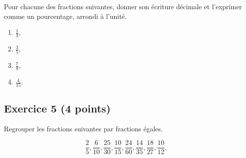 \documentclass[14 pt]{extarticle}
\theoremstyle{plain}
\begin{document}
Pour chacune des fractions suivantes, donner son écriture décimale et l'exprimer comme un pourcentage, arrondi à l'unité. 
\begin{enumerate}
\item $\frac13$,
\item $\frac35$,
\item $\frac79$,
\item $\frac{4}{15}$. 
\end{enumerate}

\subsection*{Exercice 5 (4 points)}
Regrouper les fractions suivantes par fractions égales. 

\[\frac25, \frac6{10}, \frac{25}{30},\frac{10}{15},
\frac{24}{60},\frac{14}{35}, \frac{18}{27},
\frac{10}{12}.
 \]

 	
\end{document}

